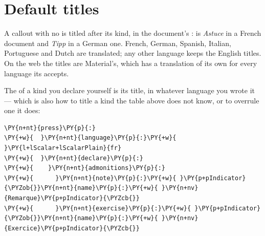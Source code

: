 \documentclass[a4paper,twoside]{article}
\begin{document}
\section{Default titles}
A callout with no  is titled after its kind, in the document's
:  is \emph{Astuce} in a French document and \emph{Tipp} in a German
one. French, German, Spanish, Italian, Portuguese and Dutch are translated;
any other language keeps the English titles. On the web the titles are
Material's, which has a translation of its own for every language its
 accepts.

The  of a kind you declare yourself is its title, in whatever language
you wrote it --- which is also how to title a kind the table above does not
know, or to overrule one it does:
\begin{tscode}[lang=yaml, engine=pygments]
\begin{Verbatim}[commandchars=\\\{\},breaklines, breakanywhere, commandchars=\\\{\}]
\PY{n+nt}{press}\PY{p}{:}
\PY{+w}{  }\PY{n+nt}{language}\PY{p}{:}\PY{+w}{ }\PY{l+lScalar+lScalarPlain}{fr}
\PY{+w}{  }\PY{n+nt}{declare}\PY{p}{:}
\PY{+w}{    }\PY{n+nt}{admonitions}\PY{p}{:}
\PY{+w}{      }\PY{n+nt}{note}\PY{p}{:}\PY{+w}{ }\PY{p+pIndicator}{\PYZob{}}\PY{n+nt}{name}\PY{p}{:}\PY{+w}{ }\PY{n+nv}{Remarque}\PY{p+pIndicator}{\PYZcb{}}
\PY{+w}{      }\PY{n+nt}{exercise}\PY{p}{:}\PY{+w}{ }\PY{p+pIndicator}{\PYZob{}}\PY{n+nt}{name}\PY{p}{:}\PY{+w}{ }\PY{n+nv}{Exercice}\PY{p+pIndicator}{\PYZcb{}}
\end{Verbatim}
\end{tscode}
\end{document}
